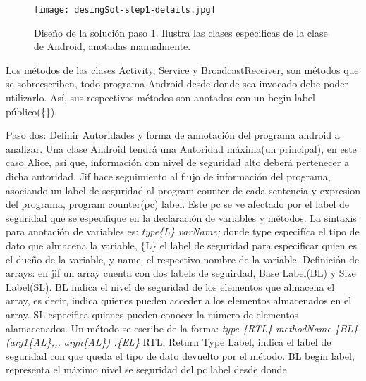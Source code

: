 \begin{figure}[h!]
	\begin{center}
	\texttt{[image: desingSol-step1-details.jpg]}
	\end{center}
	\caption{Diseño de la solución paso 1. Ilustra las clases especificas de la
	clase de Android, anotadas manualmente.}
	\label{fig:desingSol-step1}
\end{figure}

Los métodos de las clases Activity, Service y BroadcastReceiver, son métodos
que se sobreescriben, todo programa Android desde donde sea invocado debe poder
utilizarlo. Así, sus respectivos métodos son anotados con un begin label
público(\{\}).

Paso dos: 
Definir Autoridades y forma de annotación del programa android a analizar.
Una clase Android tendrá una Autoridad máxima(un principal), en este caso Alice,
así que, información con nivel de seguridad alto deberá pertenecer a dicha
autoridad.\newline
Jif hace seguimiento al flujo de información del programa, asociando un label
de seguridad al program counter de cada sentencia y expresion del programa,
program counter(pc) label. Este pc se ve afectado por el label
de seguridad que se especifique en la declaración de variables y
métodos.\newline 
La sintaxis para anotación de variables es: \newline 
\emph{ type\{L\} varName; } \newline donde type especifíca el tipo de dato que
almacena la variable, \{L\} el label de seguridad  para especificar quien es el
dueño de la variable, y name, el respectivo nombre de la variable.\newline
Definición de arrays:\newline
en jif un array cuenta con dos labels de seguirdad, Base Label(BL) y Size
Label(SL). BL indica el nivel de seguridad de los elementos que almacena el
array, es decir, indica quienes pueden acceder a los elementos almacenados en el 
array. SL especifica quienes pueden conocer la número de elementos
alamacenados.\newline
Un método se escribe de la forma:\newline
\emph{ type \{RTL\} methodName \{BL\} (arg1\{AL\},,, argn\{AL\}) :\{EL\}
}\newline RTL, Return Type Label, indica el label de seguridad con que
queda el tipo de dato devuelto por el método.\newline 
BL begin label, representa el máximo nivel se seguridad del pc label desde donde
